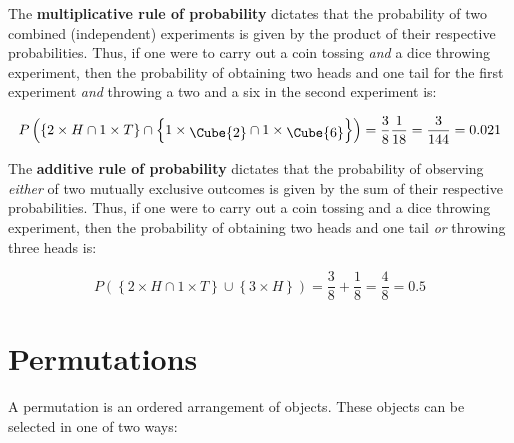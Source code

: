 The \textbf{multiplicative rule of
  probability}\label{page:multiplication} dictates that the
probability of two combined (independent) experiments is given by the
product of their respective probabilities. Thus, if one were to carry
out a coin tossing \emph{and} a dice throwing experiment, then the
probability of obtaining two heads and one tail for the first
experiment \emph{and} throwing a two and a six in the second
experiment is:

\[
P\left(\left\{2\times{H} \cap 1\times{T}\right\} \cap
\left\{1\times\mbox{\raisebox{-2pt}{\Cube{2}}} \cap
1\times\mbox{\raisebox{-2pt}{\Cube{6}}}\right\}\right) =
\frac{3}{8}\frac{1}{18} = \frac{3}{144} = 0.021
\]

The \textbf{additive rule of probability}\label{page:addition}
dictates that the probability of observing \emph{either} of two
mutually exclusive outcomes is given by the sum of their respective
probabilities. Thus, if one were to carry out a coin tossing and a
dice throwing experiment, then the probability of obtaining two heads
and one tail \emph{or} throwing three heads is:

\[
P\left(\left\{2\times{H} \cap 1\times{T}\right\} \cup
\left\{3\times{H}\right\}\right) = \frac{3}{8} + \frac{1}{8} = \frac{4}{8} = 0.5
\]

\section{Permutations}
\label{sec:permutations}

A permutation is an ordered arrangement of objects. These objects can
be selected in one of two ways:

